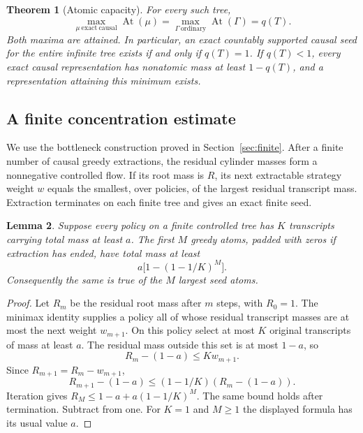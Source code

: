 \documentclass[11pt,a4paper]{article}
\newtheorem{theorem}{Theorem}[section]
\newtheorem{lemma}[theorem]{Lemma}
\theoremstyle{definition}\newtheorem{definition}[theorem]{Definition}
\theoremstyle{remark}\newtheorem{remark}[theorem]{Remark}
\newcommand{\At}{\operatorname{At}}
\numberwithin{equation}{section}
\begin{document}
\begin{theorem}[Atomic capacity]\label{inf:th:main}
For every such tree,
\[
 \boxed{\quad
 \max_{\mu\ \mathrm{exact\ causal}}\At(\mu)
 =\max_{\Gamma\ \mathrm{ordinary}}\At(\Gamma)
 =q(T).\quad}
\]
Both maxima are attained. In particular, an exact countably supported
causal seed for the entire infinite tree exists if and only if $q(T)=1$.
If $q(T)<1$, every exact causal representation has nonatomic mass at
least $1-q(T)$, and a representation attaining this minimum exists.
\end{theorem}

\subsection{A finite concentration estimate}
We use the bottleneck construction proved in Section~\ref{sec:finite}. After a
finite number of causal greedy extractions, the residual cylinder masses
form a nonnegative controlled flow. If its root mass is $R$, its next
extractable strategy weight $w$ equals the smallest, over policies, of
the largest residual transcript mass. Extraction terminates on each
finite tree and gives an exact finite seed.

\begin{lemma}\label{inf:lem:concentration}
Suppose every policy on a finite controlled tree has $K$ transcripts
carrying total mass at least $a$. The first $M$ greedy atoms, padded with
zeros if extraction has ended, have total mass at least
\[
 a\bigl[1-(1-1/K)^M\bigr].\label{inf:eq:head}
\]
Consequently the same is true of the $M$ largest seed atoms.
\end{lemma}
\begin{proof}
Let $R_m$ be the residual root mass after $m$ steps, with $R_0=1$.
The minimax identity supplies a policy all of whose residual transcript
masses are at most the next weight $w_{m+1}$. On this policy select at
most $K$ original transcripts of mass at least $a$. The residual mass
outside this set is at most $1-a$, so
\[
 R_m-(1-a)\le K w_{m+1}.
\]
Since $R_{m+1}=R_m-w_{m+1}$,
\[
 R_{m+1}-(1-a)\le(1-1/K)(R_m-(1-a)).
\]
Iteration gives $R_M\le1-a+a(1-1/K)^M$. The same bound holds after
termination. Subtract from one. For $K=1$ and $M\ge1$ the displayed
formula has its usual value $a$.
\end{proof}
\end{document}
